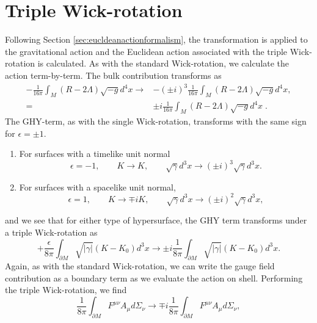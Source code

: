 \section{Triple Wick-rotation}
\label{sec:triplewickrotation}

Following Section \ref{sec:eucldeanactionformalism}, the transformation  is applied to the gravitational action  and the Euclidean action associated with the triple Wick-rotation is calculated. As with the standard Wick-rotation, we calculate the action term-by-term. The bulk contribution transforms as
\begin{equation*}
\begin{aligned}
    - \frac{1}{16\pi} \int_{M} (R - 2\Lambda) \sqrt{-g} d^4 x 
    \rightarrow 
     &- (\pm i)^{3}  \frac{1}{16\pi}  \int_{M} (R - 2\Lambda) \sqrt{-g} d^4 x ,\\
     = &\pm i \frac{1}{16\pi}  \int_{M} (R - 2\Lambda) \sqrt{-g} d^4x \;.
\end{aligned}
\end{equation*}
The GHY-term, as with the single Wick-rotation, transforms with the same sign for $\epsilon = \pm 1$.
\begin{enumerate}
    \item  
    For surfaces with a timelike unit normal
    \begin{equation*}
    	\epsilon = -1,  \qquad K \rightarrow K, \qquad \sqrt{\gamma} d^3x \rightarrow (\pm i)^{3} \sqrt{\gamma} d^3x.
    \end{equation*}
\item 
For surfaces with a spacelike unit normal, 
\begin{equation*}
	\epsilon = 1, \qquad K \rightarrow \mp i K, \qquad \sqrt{\gamma} d^3x \rightarrow (\pm i)^2 \sqrt{\gamma} d^3x,
\end{equation*}
\end{enumerate}
and we see that for either type of hypersurface, the GHY term transforms under a triple Wick-rotation as
\begin{equation*}
    + \frac{\epsilon}{8 \pi} \int_{\partial M} \sqrt{|\gamma|} (K - K_0) d^3x \rightarrow  \pm i \frac{1}{8 \pi} \int_{\partial M} \sqrt{|\gamma|} (K - K_0) d^3x.
\end{equation*}
Again, as with the standard Wick-rotation, we can write the gauge field contribution as a boundary term as we evaluate the action on shell. Performing the triple Wick-rotation, we find
\begin{equation*}
     \frac{1}{8 \pi} \int_{\partial M} F^{\mu \nu} A_{\mu} d\Sigma_{\nu} \rightarrow  \mp i \frac{1}{8 \pi} \int_{\partial M} F^{\mu \nu} A_{\mu} d\Sigma_{\nu},
\end{equation*}
